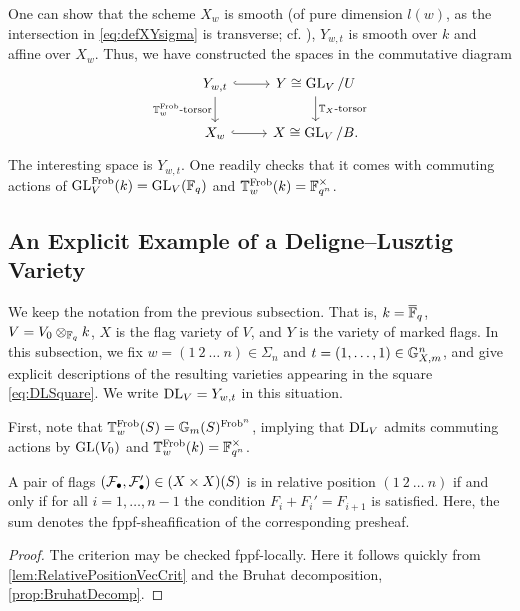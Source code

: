\documentclass[../main.tex]{subfiles}
\begin{document}
One can show that the scheme $X_w$ is smooth (of pure dimension $l(w)$, 
as the intersection in \eqref{eq:defXYsigma} is transverse; cf.
\cite{delignelusztig1976}), $Y_{w, t}$ is smooth over $k$ and affine over $X_w$. 
Thus, we have constructed the spaces in the commutative diagram
\begin{equation} \label{eq:DLSquare}
\begin{tikzcd}[ampersand replacement=\&]
	{Y_{w,t}} \& {Y \cong \GL_V/U} \\
	{X_w} \& {X \cong \GL_V/B.}
	\arrow[hook, from=1-1, to=1-2]
	\arrow["{\TT_w^{\Frob}\text{-torsor}}"', from=1-1, to=2-1]
	\arrow["{\TT_X\text{-torsor}}", from=1-2, to=2-2]
	\arrow[hook, from=2-1, to=2-2]
\end{tikzcd}
\end{equation}
The interesting space is $Y_{w,t}$. One readily checks that it comes with commuting actions of 
$\operatorname{GL}_V^{\mathrm{Frob}}(k) = \operatorname{GL}_V(\mathbb{F}_q)$ and $\mathbb{T}_w^{\mathrm{Frob}}(k) = \mathbb{F}_{q^n}^\times$. 

\subsection{An Explicit Example of a Deligne--Lusztig Variety} %
\label{sub:An Explicit Example}
We keep the notation from the previous subsection. That is, $k = \overline {\mathbb{F}}_q$, 
$V = V_0 \otimes_{\mathbb{F}_q} k$, $X$ is the flag variety of $V$, and $Y$ is the 
variety of marked flags. In this subsection, we fix
$w = (1 \ 2 \ \dots \ n) \in \Sigma_n$ and $t = (1, \dots, 1) \in \mathbb{G}_{X,m}^n$,
and give explicit descriptions of the resulting varieties appearing in the
square \eqref{eq:DLSquare}. We write $\mathrm{DL}_V = Y_{w, t}$ in this
situation.

First, note that $\mathbb{T}_w^{\mathrm{Frob}}(S) = \mathbb{G}_m(S)^{\mathrm{Frob}^n}$, implying that
$\mathrm{DL}_V$ admits commuting actions 
by $\operatorname{GL}(V_0)$ and $\mathbb{T}_w^{\mathrm{Frob}}(k) = \mathbb{F}_{q^n}^\times$.

\begin{lem}\label{lem:FlagsInRelPosWareez}
  A pair of flags $(\mathcal{F}_\bullet, \mathcal{F}_\bullet') \in (X \times X)(S)$ is in relative position
  $(1 \ 2 \ \dots \ n)$ 
  if and only if for all $i = 1, \dots, n-1$ the condition $F_i + F_i' =
  F_{i+1}$ is satisfied. Here, the sum denotes the fppf-sheafification of the
  corresponding presheaf. 
\begin{proof}
  The criterion may be checked fppf-locally.
  Here it follows quickly from \cref{lem:RelativePositionVecCrit} and 
  the Bruhat decomposition, \cref{prop:BruhatDecomp}.
  \end{proof}
\end{lem}
\end{document}
